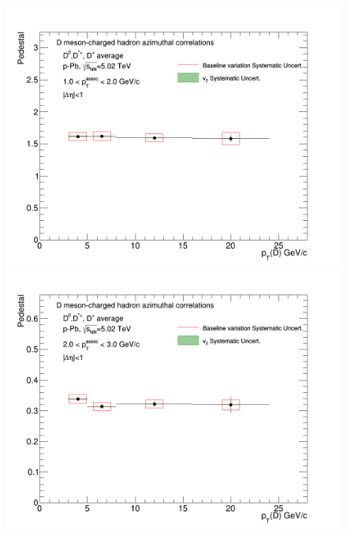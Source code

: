 \begin{figure}[!htbp]
{\includegraphics[width=0.49\linewidth, height=0.33\linewidth]{figures/FitOutput/CanvasFinalTrendPedestal_pthad1dotto2dot.png}}
{\includegraphics[width=0.49\linewidth, height=0.33\linewidth]{figures/FitOutput/CanvasFinalTrendPedestal_pthad2dotto3dot.png}}
\end{figure}


